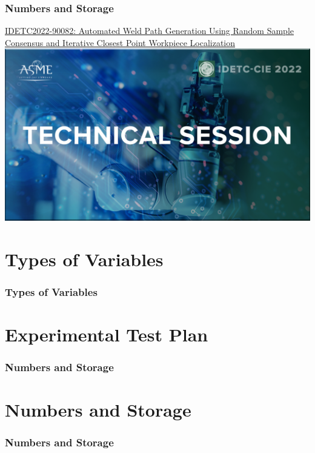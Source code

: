 \documentclass[fleqn]{beamer} %
\newcommand{\sectionIItitle}{Types of Variables}
\newcommand{\sectionIIItitle}{Experimental Test Plan}
\newcommand{\sectionIVtitle}{Numbers and Storage}
\begin{document}
			\begin{frame}[label=sectionIV]
				\frametitle{\sectionIVtitle}
				\href{https://events-platform.asmeconferences.org/event/idetc-cie-2022/planning/UGxhbm5pbmdfOTcxNDk4}{IDETC2022-90082: Automated Weld Path Generation Using Random Sample Consensus and Iterative Closest Point Workpiece Localization}\vspace{5mm}\\

				\includegraphics[scale=0.125]{images/IDETC_technical_session.png}

			\end{frame}	


	\section{\sectionIItitle}\label{sectionII}

		\begin{frame}[label=sectionII]
			\frametitle{\sectionIItitle}

		\end{frame}


	\section{\sectionIIItitle}\label{sectionIII}

		\begin{frame}[label=sectionIII] 
			\frametitle{\sectionIVtitle}


		\end{frame}


	\section{\sectionIVtitle}\label{sectionIV}

		\begin{frame}[label=sectionIV]
			\frametitle{\sectionIVtitle}

		\end{frame}
\end{document}
